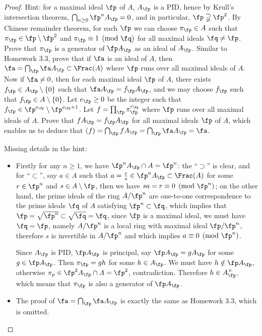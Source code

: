 \iffalse
\begin{proof}
Hint: for a maximal ideal
$\fp$ of $A$, $A_\fp$ is a PID, hence by Krull's intersection theorem,
$\bigcap_{n\geq 0}\fp^nA_\fp=0$,
and in particular, $\fp\supsetneqq\fp^2$. By Chinese remainder theorem,
for each $\fp$ we can choose $\pi_\fp\in A$ such that
$\pi_\fp\in\fp\setminus\fp^2$ and $\pi_\fp\equiv 1\pmod{\fq}$
for all maximal ideals $\fq\neq\fp$.
Prove that $\pi_\fp$ is a generator of $\fp A_\fp$ as an ideal of $A_\fp$.
Similar to Homework 3.3,
prove that if $\fa$ is an ideal of $A$, then
$\fa=\bigcap_\fp\fa A_\fp\subset\Frac(A)$ where $\fp$ runs over all maximal ideals
of $A$.
Now if $\fa\neq 0$, then for each maximal ideal $\fp$ of $A$,
there exists $f_\fp\in A_\fp\setminus\{0\}$ such that $\fa A_\fp=f_\fp A_\fp$,
and we may choose $f_\fp$ such that $f_\fp\in A\setminus\{0\}$.
Let $e_\fp\geq 0$
be the integer such that $f_\fp\in\fp^{e_\fp}\setminus\fp^{e_\fp+1}$.
Let $f=\prod_\fp\pi_\fp^{e_\fp}$ where $\fp$ runs over all maximal ideals
of $A$.
Prove that $fA_\fp=f_\fp A_\fp$ for all maximal ideals $\fp$ of $A$,
which enables us to deduce that $(f)=\bigcap_\fp fA_\fp=\bigcap_\fp\fa A_\fp
=\fa$.

Missing details in the hint:
\begin{itemize}
\item
Firstly for any $n\geq 1$, we have $\fp^nA_\fp\cap A=\fp^n$: the ``$\supset$''
is clear, and for ``$\subset$'', say $a\in A$ such that
$a=\frac{r}{s}\in\fp^nA_\fp\subset\Frac(A)$ for some $r\in\fp^n$ and $s\in A\setminus\fp$,
then we have $sa=r\equiv 0\pmod{\fp^n}$;
on the other hand, the prime ideals of the ring $A/\fp^n$ are one-to-one correspondence to the prime ideals $\fq$ of $A$ satisfying $\fp^n\subset\fq$,
which implies that $\fp=\sqrt{\fp^n}\subset\sqrt\fq=\fq$, since $\fp$ is a maximal ideal,
we must have $\fq=\fp$, namely $A/\fp^n$ is a local ring with maximal ideal
$\fp/\fp^n$, therefore $s$ is invertible in $A/\fp^n$ and which implies
$a\equiv 0\pmod{\fp^n}$.

Since $A_\fp$ is PID, $\fp A_\fp$ is principal, say $\fp A_\fp=gA_\fp$
for some $g\in\fp A_\fp$.
Then $\pi_\fp=gh$ for some $h\in A_\fp$.
We must have $h\notin\fp A_\fp$, otherwise $\pi_p\in\fp^2 A_\fp\cap A=\fp^2$, contradiction. Therefore $h\in A_\fp^\times$, which means that $\pi_\fp$ is also a generator of $\fp A_\fp$.

\item
The proof of $\fa=\bigcap_\fp\fa A_\fp$ is exactly the same as
Homework 3.3, which is omitted.


\end{itemize}
\end{proof}
